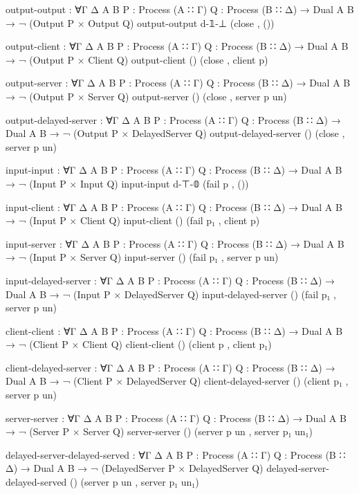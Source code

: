 \begin{code}
output-output :
  ∀{Γ Δ A B} {P : Process (A ∷ Γ)} {Q : Process (B ∷ Δ)} → Dual A B → ¬ (Output P × Output Q)
output-output d-𝟙-⊥ (close , ())

output-client :
  ∀{Γ Δ A B} {P : Process (A ∷ Γ)} {Q : Process (B ∷ Δ)} → Dual A B → ¬ (Output P × Client Q)
output-client () (close , client p)

output-server :
  ∀{Γ Δ A B} {P : Process (A ∷ Γ)} {Q : Process (B ∷ Δ)} → Dual A B → ¬ (Output P × Server Q)
output-server () (close , server p un)

output-delayed-server :
  ∀{Γ Δ A B} {P : Process (A ∷ Γ)} {Q : Process (B ∷ Δ)} → Dual A B → ¬ (Output P × DelayedServer Q)
output-delayed-server () (close , server p un)

input-input :
  ∀{Γ Δ A B} {P : Process (A ∷ Γ)} {Q : Process (B ∷ Δ)} → Dual A B → ¬ (Input P × Input Q)
input-input d-⊤-𝟘 (fail p , ())

input-client :
  ∀{Γ Δ A B} {P : Process (A ∷ Γ)} {Q : Process (B ∷ Δ)} → Dual A B → ¬ (Input P × Client Q)
input-client () (fail p₁ , client p)

input-server :
  ∀{Γ Δ A B} {P : Process (A ∷ Γ)} {Q : Process (B ∷ Δ)} → Dual A B → ¬ (Input P × Server Q)
input-server () (fail p₁ , server p un)

input-delayed-server :
  ∀{Γ Δ A B} {P : Process (A ∷ Γ)} {Q : Process (B ∷ Δ)} → Dual A B → ¬ (Input P × DelayedServer Q)
input-delayed-server () (fail p₁ , server p un)

client-client :
  ∀{Γ Δ A B} {P : Process (A ∷ Γ)} {Q : Process (B ∷ Δ)} → Dual A B → ¬ (Client P × Client Q)
client-client () (client p , client p₁)

client-delayed-server :
  ∀{Γ Δ A B} {P : Process (A ∷ Γ)} {Q : Process (B ∷ Δ)} → Dual A B → ¬ (Client P × DelayedServer Q)
client-delayed-server () (client p₁ , server p un)

server-server :
  ∀{Γ Δ A B} {P : Process (A ∷ Γ)} {Q : Process (B ∷ Δ)} → Dual A B → ¬ (Server P × Server Q)
server-server () (server p un , server p₁ un₁)

delayed-server-delayed-served :
  ∀{Γ Δ A B} {P : Process (A ∷ Γ)} {Q : Process (B ∷ Δ)} → Dual A B → ¬ (DelayedServer P × DelayedServer Q)
delayed-server-delayed-served () (server p un , server p₁ un₁)


\end{code}
